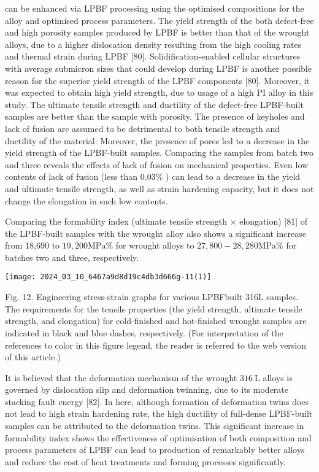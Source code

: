 \documentclass[10pt]{article}
\begin{document}
can be enhanced via LPBF processing using the optimised compositions for the alloy and optimised process parameters. The yield strength of the both defect-free and high porosity samples produced by LPBF is better than that of the wrought alloys, due to a higher dislocation density resulting from the high cooling rates and thermal strain during LPBF [80]. Solidification-enabled cellular structures with average submicron sizes that could develop during LPBF is another possible reason for the superior yield strength of the LPBF components [80]. Moreover, it was expected to obtain high yield strength, due to usage of a high PI alloy in this study. The ultimate tensile strength and ductility of the defect-free LPBF-built samples are better than the sample with porosity. The presence of keyholes and lack of fusion are assumed to be detrimental to both tensile strength and ductility of the material. Moreover, the presence of pores led to a decrease in the yield strength of the LPBF-built samples. Comparing the samples from batch two and three reveals the effects of lack of fusion on mechanical properties. Even low contents of lack of fusion (less than $0.03 \%$ ) can lead to a decrease in the yield and ultimate tensile strength, as well as strain hardening capacity, but it does not change the elongation in such low contents.

Comparing the formability index (ultimate tensile strength $\times$ elongation) [81] of the LPBF-built samples with the wrought alloy also shows a significant increase from 18,690 to $19,200 \mathrm{MPa} \%$ for wrought alloys to $27,800-28,280 \mathrm{MPa} \%$ for batches two and three, respectively.

\begin{center}
\texttt{[image: 2024\_03\_10\_6467a9d8d19c4db3d666g-11(1)]}
\end{center}

Fig. 12. Engineering stress-strain graphs for various LPBFbuilt 316L samples. The requirements for the tensile properties (the yield strength, ultimate tensile strength, and elongation) for cold-finished and hot-finished wrought samples are indicated in black and blue dashes, respectively. (For interpretation of the references to color in this figure legend, the reader is referred to the web version of this article.)

It is believed that the deformation mechanism of the wrought $316 \mathrm{~L}$ alloys is governed by dislocation slip and deformation twinning, due to its moderate stacking fault energy [82]. In here, although formation of deformation twins does not lead to high strain hardening rate, the high ductility of full-dense LPBF-built samples can be attributed to the deformation twins. This significant increase in formability index shows the effectiveness of optimisation of both composition and process parameters of LPBF can lead to production of remarkably better alloys and reduce the cost of heat treatments and forming processes significantly.
\end{document}
